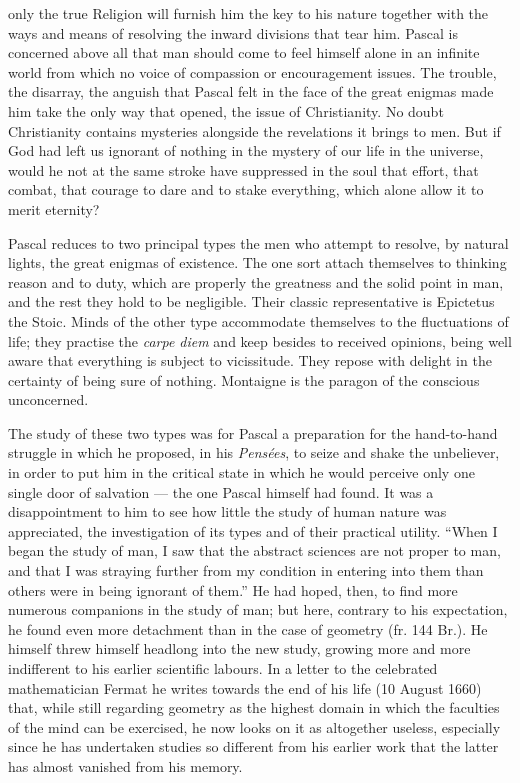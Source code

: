 \documentclass[12pt,a4paper]{article}
\newcommand{\opage}[1]{\marginnote{\footnotesize\textit{[#1]}}}
\begin{document}
\opage{231}only the true Religion will furnish him the key to his nature together with the
ways and means of resolving the inward divisions that tear him. Pascal is
concerned above all that man should come to feel himself alone in an infinite
world from which no voice of compassion or encouragement issues. The trouble,
the disarray, the anguish that Pascal felt in the face of the great enigmas made
him take the only way that opened, the issue of Christianity. No doubt
Christianity contains mysteries alongside the revelations it brings to men. But
if God had left us ignorant of nothing in the mystery of our life in the
universe, would he not at the same stroke have suppressed in the soul that
effort, that combat, that courage to dare and to stake everything, which alone
allow it to merit eternity?

Pascal reduces to two principal types the men who attempt to resolve, by
natural lights, the great enigmas of existence. The one sort attach themselves
to thinking reason and to duty, which are properly the greatness and the solid
point in man, and the rest they hold to be negligible. Their classic
representative is Epictetus the Stoic. Minds of the other type accommodate
themselves to the fluctuations of life; they practise the \emph{carpe diem}
and keep besides to received opinions, being well aware that everything is
subject to vicissitude. They repose with delight in the certainty of being sure
of nothing. Montaigne is the paragon of the conscious unconcerned.

The study of these two types was for Pascal a preparation for the hand-to-hand
struggle in which he proposed, in his \emph{Pensées}, to seize and shake the
unbeliever, in order to put him in the critical state in which he would perceive
only one single door of salvation --- the one Pascal himself had found. It was
a disappointment to him to see how little the study of human nature was
appreciated, the investigation of its types and of their practical utility.
``When I began the study of man, I saw that the abstract sciences are not proper
to man, and that I was straying further from my condition in entering into them
than others were in being ignorant of them.'' He had hoped, then, to find more
numerous companions in the study of man; but here, contrary to his expectation,
he found even more detachment than in the case of geometry (fr. 144 Br.). He
himself threw himself headlong into the new study, growing more and more
indifferent to his earlier scientific labours. In a letter to the celebrated
mathematician Fermat he writes towards the end of his life (10 August 1660)
that, while still
\opage{232}regarding geometry as the highest domain in which the faculties of the mind can
be exercised, he now looks on it as altogether useless, especially since he has
undertaken studies so different from his earlier work that the latter has almost
vanished from his memory.
\end{document}
